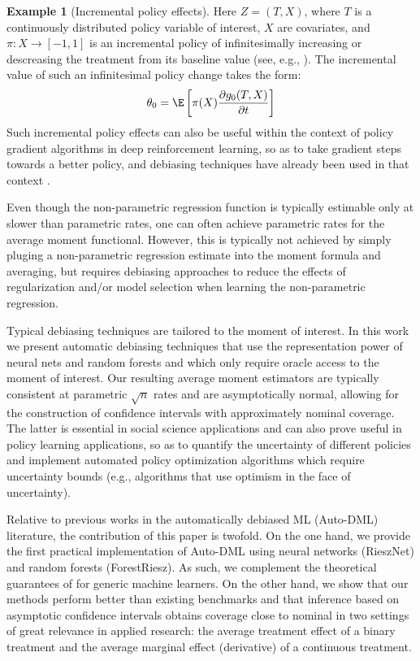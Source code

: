 \documentclass[nohyperref]{article}
\newcommand{\der}[2]{\frac{\partial #1}{\partial #2}}
\theoremstyle{plain}
\theoremstyle{definition}
\newtheorem{example}[theorem]{Example}
\theoremstyle{remark}
\begin{document}
\begin{example}[Incremental policy effects] \label{ex4} Here $Z=(T,X)$, where $T$ is a continuously distributed policy variable of interest, $X$ are covariates, and $\pi: X\to [-1,1]$ is an incremental policy of infinitesimally increasing or descreasing the treatment from its baseline value (see, e.g., \citealp{athey2021policy}). The incremental value of such an infinitesimal policy change takes the form:
\begin{align*}
    \theta_0 = \E\left[\pi(X) \der{g_0(T,X)}{t}\right] %
\end{align*}
Such incremental policy effects can also be useful within the context of policy gradient algorithms in deep reinforcement learning, so as to take gradient steps towards a better policy, and debiasing techniques have already been used in that context \citep{grathwohl2017backpropagation}.
\end{example}

Even though the non-parametric regression function is typically estimable only at slower than parametric rates, one can often achieve parametric rates for the average moment functional. However, this is typically not achieved by simply pluging a non-parametric regression estimate into the moment formula and averaging, but requires debiasing approaches to reduce the effects of regularization and/or model selection when learning the non-parametric regression.

Typical debiasing techniques are tailored to the moment of interest. In this work we present automatic debiasing techniques that use the representation power of neural nets and random forests and which only require oracle access to the moment of interest. Our resulting average moment estimators are typically consistent at parametric $\sqrt{n}$ rates and are asymptotically normal, allowing for the construction of confidence intervals with approximately nominal coverage. The latter is essential in social science applications and can also prove useful in policy learning applications, so as to quantify the uncertainty of different policies and implement automated policy optimization algorithms which require uncertainty bounds (e.g., algorithms that use optimism in the face of uncertainty).

Relative to previous works in the automatically debiased ML (Auto-DML) literature, the contribution of this paper is twofold. On the one hand, we provide the first practical implementation of Auto-DML using neural networks (RieszNet) and random forests (ForestRiesz). As such, we complement the theoretical guarantees of \citet{chernozhukov2021automatic} for generic machine learners. On the other hand, we show that our methods perform better than existing benchmarks and that inference based on asymptotic confidence intervals obtains coverage close to nominal in two settings of great relevance in applied research: the average treatment effect of a binary treatment and the average marginal effect (derivative) of a continuous treatment.
\end{document}
